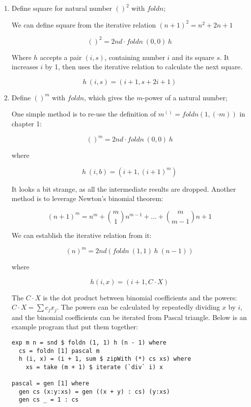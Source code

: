 \documentclass[UTF8]{article}
\begin{document}
\begin{enumerate}
\item Define square for natural number $()^2$ with $foldn$;

We can define square from the iterative relation $(n+1)^2 = n^2 + 2n + 1$

\[
()^2 = 2nd \cdot foldn\ (0, 0)\ h
\]

Where $h$ accepts a pair $(i, s)$, containing number $i$ and its square $s$. It increases $i$ by 1, then uses the iterative relation to calculate the next square.

\[
h\ (i, s) = (i + 1, s + 2i + 1)
\]

\item Define $()^m$ with $foldn$, which gives the $m$-power of a natural number;

One simple method is to re-use the definition of $m^{()} = foldn(1, (\cdot m))$ in chapter 1:

\[
()^m = 2nd \cdot foldn\ (0, 0)\ h
\]

where

\[
h\ (i, b) = (i + 1, (i + 1)^m)
\]

It looks a bit strange, as all the intermediate results are dropped. Another method is to leverage Newton's binomial theorem:

\[
(n + 1)^m = n^m + \binom{m}{1} n^{m-1} + ... + \binom{m}{m-1} n + 1
\]

We can establish the iterative relation from it:

\[
(n)^m = 2nd(foldn\ (1, 1)\ h\ (n - 1))
\]

where

\[
h (i, x) = (i + 1, C \cdot X)
\]

The $C \cdot X$ is the dot product between binomial coefficients and the powers: $C \cdot X = \sum c_j x_j$. The powers can be calculated by repeatedly dividing $x$ by $i$, and the binomial coefficients can be iterated from Pascal triangle. Below is an example program that put them together:

\lstset{language=Haskell
    , frame=single
}
\begin{lstlisting}
exp m n = snd $ foldn (1, 1) h (n - 1) where
  cs = foldn [1] pascal m
  h (i, x) = (i + 1, sum $ zipWith (*) cs xs) where
    xs = take (m + 1) $ iterate (`div` i) x

pascal = gen [1] where
  gen cs (x:y:xs) = gen ((x + y) : cs) (y:xs)
  gen cs _ = 1 : cs
\end{lstlisting} %


\end{enumerate}
\end{document}
